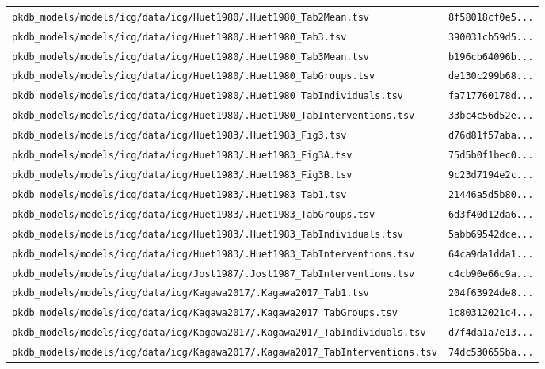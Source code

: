 \begin{longtable}{ll}
\texttt{pkdb\_models/models/icg/data/icg/Huet1980/.Huet1980\_Tab2Mean.tsv} & \texttt{8f58018cf0e5...} \\
\texttt{pkdb\_models/models/icg/data/icg/Huet1980/.Huet1980\_Tab3.tsv} & \texttt{390031cb59d5...} \\
\texttt{pkdb\_models/models/icg/data/icg/Huet1980/.Huet1980\_Tab3Mean.tsv} & \texttt{b196cb64096b...} \\
\texttt{pkdb\_models/models/icg/data/icg/Huet1980/.Huet1980\_TabGroups.tsv} & \texttt{de130c299b68...} \\
\texttt{pkdb\_models/models/icg/data/icg/Huet1980/.Huet1980\_TabIndividuals.tsv} & \texttt{fa717760178d...} \\
\texttt{pkdb\_models/models/icg/data/icg/Huet1980/.Huet1980\_TabInterventions.tsv} & \texttt{33bc4c56d52e...} \\
\texttt{pkdb\_models/models/icg/data/icg/Huet1983/.Huet1983\_Fig3.tsv} & \texttt{d76d81f57aba...} \\
\texttt{pkdb\_models/models/icg/data/icg/Huet1983/.Huet1983\_Fig3A.tsv} & \texttt{75d5b0f1bec0...} \\
\texttt{pkdb\_models/models/icg/data/icg/Huet1983/.Huet1983\_Fig3B.tsv} & \texttt{9c23d7194e2c...} \\
\texttt{pkdb\_models/models/icg/data/icg/Huet1983/.Huet1983\_Tab1.tsv} & \texttt{21446a5d5b80...} \\
\texttt{pkdb\_models/models/icg/data/icg/Huet1983/.Huet1983\_TabGroups.tsv} & \texttt{6d3f40d12da6...} \\
\texttt{pkdb\_models/models/icg/data/icg/Huet1983/.Huet1983\_TabIndividuals.tsv} & \texttt{5abb69542dce...} \\
\texttt{pkdb\_models/models/icg/data/icg/Huet1983/.Huet1983\_TabInterventions.tsv} & \texttt{64ca9da1dda1...} \\
\texttt{pkdb\_models/models/icg/data/icg/Jost1987/.Jost1987\_TabInterventions.tsv} & \texttt{c4cb90e66c9a...} \\
\texttt{pkdb\_models/models/icg/data/icg/Kagawa2017/.Kagawa2017\_Tab1.tsv} & \texttt{204f63924de8...} \\
\texttt{pkdb\_models/models/icg/data/icg/Kagawa2017/.Kagawa2017\_TabGroups.tsv} & \texttt{1c80312021c4...} \\
\texttt{pkdb\_models/models/icg/data/icg/Kagawa2017/.Kagawa2017\_TabIndividuals.tsv} & \texttt{d7f4da1a7e13...} \\
\texttt{pkdb\_models/models/icg/data/icg/Kagawa2017/.Kagawa2017\_TabInterventions.tsv} & \texttt{74dc530655ba...} \\

\end{longtable}
